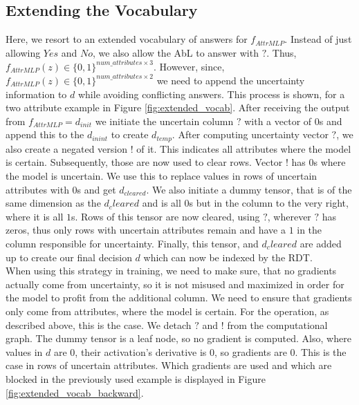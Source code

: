 \documentclass[a4paper,cleardoubleempty,BCOR1cm, 11pt]{report}
\begin{document}



\subsection{Extending the Vocabulary}
Here, we resort to an extended vocabulary of answers for $f_{AttrMLP}$. Instead of just allowing $Yes$ and $No$, we also allow the AbL to answer with $?$. Thus, $f_{AttrMLP}(z) \in \lbrace 0,1 \rbrace^{num\_attributes \times 3}$. However, since, $f_{AttrMLP}(z) \in \lbrace 0,1 \rbrace^{num\_attributes \times 2}$ we need to append the uncertainty information to $d$ while avoiding conflicting answers. This process is shown, for a two attribute example in Figure \ref{fig:extended_vocab}. After receiving the output from $f_{AttrMLP} = d_{init}$ we initiate the uncertain column $?$ with a vector of $0$s and append this to the $d_{inint}$ to create $d_{temp}$. After computing uncertainty vector $?$, we also create a negated version $!$ of it. This indicates all attributes where the model is certain. Subsequently, those are now used to clear rows. Vector $!$ has $0$s where the model is uncertain. We use this to replace values in rows of uncertain attributes with $0$s and get $d_{cleared}$. We also initiate a dummy tensor, that is of the same dimension as the $d_cleared$ and is all $0$s but in the column to the very right, where it is all $1$s. Rows of this tensor are now cleared, using $?$, wherever $?$ has zeros, thus only rows with uncertain attributes remain and have a $1$ in the column responsible for uncertainty. Finally, this tensor, and $d_cleared$ are added up to create our final decision $d$ which can now be indexed by the RDT.\\
When using this strategy in training, we need to make sure, that no gradients actually come from uncertainty, so it is not misused and maximized in order for the model to profit from the additional column. We need to ensure that gradients only come from attributes, where the model is certain. For the operation, as described above, this is the case. We detach $?$ and $!$ from the computational graph. The dummy tensor is a leaf node, so no gradient is computed. Also, where values  in $d$ are $0$, their activation's derivative is $0$, so gradients are $0$. This is the case in rows of uncertain attributes. Which gradients are used and which are blocked in the previously used example is displayed in Figure \ref{fig:extended_vocab_backward}.
\end{document}
